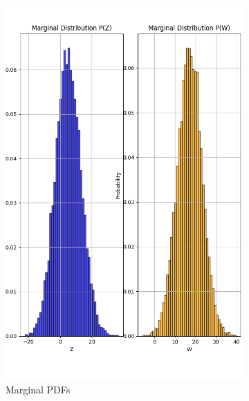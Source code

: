 \documentclass{article}
\begin{document}
\begin{figure}[H]
  \centering
  \begin{subfigure}{0.45\textwidth}
    \centering
    \includegraphics[width=\linewidth]{results/section3/b(1).png}
    \caption{Marginal PDFs}
  \end{subfigure}
  \hfill
  \begin{subfigure}{0.45\textwidth}

\end{subfigure}
\end{figure}
\end{document}
